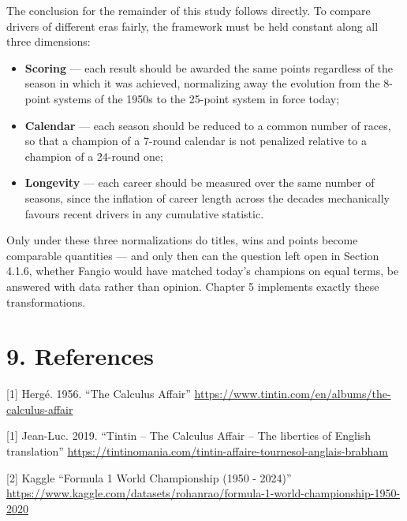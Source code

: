 \documentclass[
]{article}
\providecommand{\tightlist}{%
  \setlength{\itemsep}{0pt}\setlength{\parskip}{0pt}}
\begin{document}
The conclusion for the remainder of this study follows directly. To
compare drivers of different eras fairly, the framework must be held
constant along all three dimensions:

\begin{itemize}
\tightlist
\item
  \textbf{Scoring} --- each result should be awarded the same points
  regardless of the season in which it was achieved, normalizing away
  the evolution from the 8-point systems of the 1950s to the 25-point
  system in force today;
\item
  \textbf{Calendar} --- each season should be reduced to a common number
  of races, so that a champion of a 7-round calendar is not penalized
  relative to a champion of a 24-round one;
\item
  \textbf{Longevity} --- each career should be measured over the same
  number of seasons, since the inflation of career length across the
  decades mechanically favours recent drivers in any cumulative
  statistic.
\end{itemize}

Only under these three normalizations do titles, wins and points become
comparable quantities --- and only then can the question left open in
Section 4.1.6, whether Fangio would have matched today's champions on
equal terms, be answered with data rather than opinion. Chapter 5
implements exactly these transformations.

\newpage

\section{9. References}\label{references}

{[}1{]} Hergé. 1956. ``The Calculus Affair''
\url{https://www.tintin.com/en/albums/the-calculus-affair}

\vspace{10pt}

{[}1{]} Jean-Luc. 2019. ``Tintin -- The Calculus Affair -- The liberties
of English translation''
\url{https://tintinomania.com/tintin-affaire-tournesol-anglais-brabham}

\vspace{10pt}

{[}2{]} Kaggle ``Formula 1 World Championship (1950 - 2024)''
\url{https://www.kaggle.com/datasets/rohanrao/formula-1-world-championship-1950-2020}

\vspace{10pt}
\end{document}
